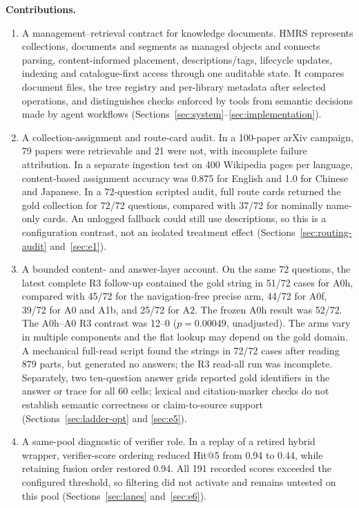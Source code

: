 \noindent\textbf{Contributions.}
\begin{enumerate}
\item A management--retrieval contract for knowledge documents. HMRS represents
collections, documents and segments as managed objects and connects parsing,
content-informed placement, descriptions/tags, lifecycle updates, indexing and
catalogue-first access through one auditable state. It compares document files,
the tree registry and per-library metadata after selected operations, and
distinguishes checks enforced by tools from semantic decisions made by agent
workflows (Sections~\ref{sec:system}--\ref{sec:implementation}).
\item A collection-assignment and route-card audit. In a 100-paper arXiv
campaign, 79 papers were retrievable and 21 were not, with incomplete failure
attribution. In a separate ingestion test on 400 Wikipedia pages per language,
content-based assignment accuracy was 0.875 for English and 1.0 for Chinese and
Japanese. In a 72-question scripted audit, full route cards returned the gold
collection for 72/72 questions, compared with 37/72 for nominally name-only
cards. An unlogged fallback could still use descriptions, so this is a
configuration contrast, not an isolated treatment effect
(Sections~\ref{sec:routing-audit} and~\ref{sec:e1}).
\item A bounded content- and answer-layer account. On the same 72 questions,
the latest complete R3 follow-up contained the gold string in 51/72 cases for
A0h,
compared with 45/72 for the navigation-free precise arm, 44/72 for A0f, 39/72
for A0 and A1b, and 25/72 for A2. The frozen A0h result was 52/72. The A0h--A0
R3 contrast was 12--0 ($p=0.00049$, unadjusted). The arms vary in multiple
components and the flat lookup may depend on the gold domain. A mechanical
full-read script found the strings in 72/72 cases after reading 879 parts, but
generated no answers; the R3 read-all run was incomplete. Separately, two
ten-question answer grids reported gold identifiers in the answer or trace for
all 60 cells; lexical and citation-marker checks do not establish semantic
correctness or claim-to-source support (Sections~\ref{sec:ladder-opt} and
\ref{sec:e5}).
\item A same-pool diagnostic of verifier role. In a replay of a retired hybrid
wrapper, verifier-score ordering reduced Hit@5 from 0.94 to 0.44, while retaining
fusion order restored 0.94. All 191 recorded scores exceeded the configured
threshold, so filtering did not activate and remains untested on this pool
(Sections~\ref{sec:lanes} and~\ref{sec:e6}).
\end{enumerate}

